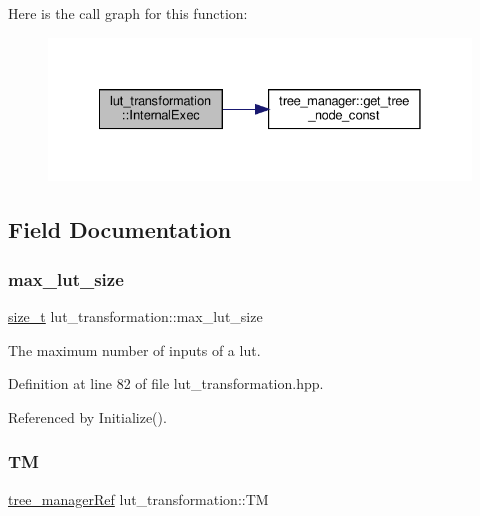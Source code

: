 Here is the call graph for this function\+:
\nopagebreak
\begin{figure}[H]
\begin{center}
\leavevmode
\includegraphics[width=328pt]{d4/d19/classlut__transformation_a63de4e9273d6ab51e6a8730192ff759c_cgraph}
\end{center}
\end{figure}


\subsection{Field Documentation}
\mbox{\label{classlut__transformation_a8506fa3c6e958725ebd8baf8b581b37b}} 
\subsubsection{\texorpdfstring{max\+\_\+lut\+\_\+size}{max\_lut\_size}}
{\footnotesize\ttfamily \hyperlink{tutorial__fpt__2017_2intro_2sixth_2test_8c_a7c94ea6f8948649f8d181ae55911eeaf}{size\+\_\+t} lut\+\_\+transformation\+::max\+\_\+lut\+\_\+size\hspace{0.3cm}{\ttfamily [private]}}



The maximum number of inputs of a lut. 



Definition at line 82 of file lut\+\_\+transformation.\+hpp.



Referenced by Initialize().

\mbox{\label{classlut__transformation_a5971f226cdbed3d142f437a7ec5609a4}} 
\subsubsection{\texorpdfstring{TM}{TM}}
{\footnotesize\ttfamily \hyperlink{tree__manager_8hpp_a96ff150c071ce11a9a7a1e40590f205e}{tree\+\_\+manager\+Ref} lut\+\_\+transformation\+::\+TM\hspace{0.3cm}{\ttfamily [private]}}



